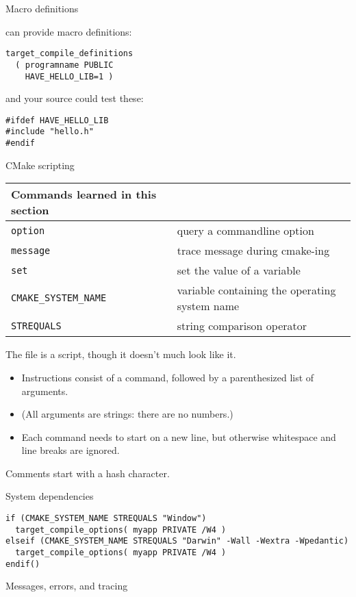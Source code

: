  {Macro definitions}

 can provide macro definitions:
\begin{lstlisting}
target_compile_definitions
  ( programname PUBLIC
    HAVE_HELLO_LIB=1 )
\end{lstlisting}
and your source could test these:
\lstset{language=C}
\begin{lstlisting}
#ifdef HAVE_HELLO_LIB
#include "hello.h"
#endif
\end{lstlisting}
\lstset{language=CMake}

 {CMake scripting}
\label{sec:cmake-script}

\begin{tabular}{lp{3in}}
  \toprule
  Commands learned in this section\\
  \midrule
  \lstinline+option+&query a commandline option\\
  \lstinline+message+&trace message during cmake-ing\\
  \lstinline+set+&set the value of a variable\\
  \lstinline+CMAKE_SYSTEM_NAME+&variable containing the operating system name\\
  \lstinline+STREQUALS+&string comparison operator\\
  \bottomrule
\end{tabular}

The  file is a script,
though it doesn't much look like it.
\begin{itemize}
\item
  Instructions consist of a command, followed by a parenthesized
  list of arguments.
\item
  (All arguments are strings: there are no numbers.)
\item
  Each command needs to start on a new line, but otherwise
  whitespace and line breaks are ignored.
\end{itemize}

Comments start with a hash character.

 {System dependencies}

\begin{lstlisting}
if (CMAKE_SYSTEM_NAME STREQUALS "Window")
  target_compile_options( myapp PRIVATE /W4 )
elseif (CMAKE_SYSTEM_NAME STREQUALS "Darwin" -Wall -Wextra -Wpedantic)
  target_compile_options( myapp PRIVATE /W4 )
endif()
\end{lstlisting}

 {Messages, errors, and tracing}

